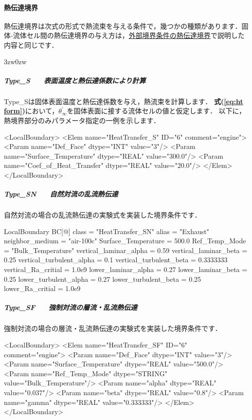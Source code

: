 %
\paragraph{熱伝達境界}
熱伝達境界は次式の形式で熱流束を与える条件で，幾つかの種類があります．固体-流体セル間の熱伝達境界の与え方は，\hyperlink{tgt:heat-transfer}{外部境界条件の熱伝達境界}で説明した内容と同じです．

\begin{indentation}{3zw}{0zw}
%
\subparagraph{Type\_S　　表面温度と熱伝達係数により計算}
Type\_Sは固体表面温度と熱伝達係数を与え，熱流束を計算します．
\textbf{式(\ref{eq:ht form})}において，$\theta_{\infty}^{\prime}$を固体表面に接する流体セルの値と仮定します．
以下に，熱境界部分のみパラメータ指定の一例を示します．

{\small
\begin{program}
<LocalBoundary>
  <Elem name="HeatTransfer_S" ID="6" comment="engine">
    <Param name="Def_Face"              dtype="INT"  value="3"/>
    <Param name="Surface_Temperature"   dtype="REAL" value="300.0"/>
    <Param name="Coef_of_Heat_Transfer" dtype="REAL" value="20.0"/>
  </Elem>
</LocalBoundary>
\end{program}
}

%
\subparagraph{Type\_SN　　自然対流の乱流熱伝達}
自然対流の場合の乱流熱伝達の実験式を実装した境界条件です．

{\small
\begin{program}
LocalBoundary {
    BC[@] {
      class                    = "HeatTransfer_SN"
      alias                    = "Exhaust"
      neighbor_medium          = "air-100c"
      Surface_Temperature      = 500.0
      Ref_Temp_Mode            = "Bulk_Temperature"
      vertical_laminar_alpha   = 0.59
      vertical_laminar_beta    = 0.25
      vertical_turbulent_alpha = 0.1
      vertical_turbulent_beta  = 0.3333333
      vertical_Ra_critial      = 1.0e9
      lower_laminar_alpha      = 0.27
      lower_laminar_beta       = 0.25
      lower_turbulent_alpha    = 0.27
      lower_turbulent_beta     = 0.25
      lower_Ra_critial         = 1.0e9
    }
}
\end{program}
}

%
\subparagraph{Type\_SF　　強制対流の層流・乱流熱伝達}
強制対流の場合の層流・乱流熱伝達の実験式を実装した境界条件です．

{\small
\begin{program}
<LocalBoundary>
  <Elem name="HeatTransfer_SF" ID="6" comment="engine">
    <Param name="Def_Face"            dtype="INT"    value="3"/>
    <Param name="Surface_Temperature" dtype="REAL"   value="500.0"/>
    <Param name="Ref_Temp_Mode"       dtype="STRING" value="Bulk_Temperature"/>
    <Param name="alpha"               dtype="REAL"   value="0.037"/>
    <Param name="beta"                dtype="REAL"   value="0.8"/>
    <Param name="gamma"               dtype="REAL"   value="0.333333"/>
  </Elem>
</LocalBoundary>
\end{program}
}


\end{indentation}
